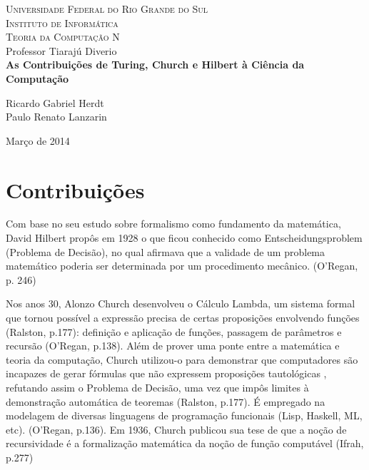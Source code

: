 \documentclass[a4paper]{article}
\author{Ricardo Gabriel Herdt (160622)\\
                Instituto de Informática,\\
                UFRGS}
\date{5 de Outubro de 2013}
\begin{document}
\begin{titlepage}
\begin{center}


\textsc{\large Universidade Federal do Rio Grande do Sul}\\[0.3cm]

\textsc{\large Instituto de Informática }\\[0.3cm]

\textsc{\large Teoria da Computação N }\\[0.3cm]

\large Professor Tiarajú Diverio \\[4.5cm]

{ \LARGE \bfseries As Contribuições de Turing, Church e Hilbert à Ciência
da Computação  \\[4.0cm] }


Ricardo Gabriel Herdt \\
Paulo Renato Lanzarin


\vfill

{\large Março de 2014}

\end{center}
\end{titlepage}




\section{Contribuições}

        Com base no seu estudo sobre formalismo como fundamento da matemática,
David Hilbert propôs em 1928 o que ficou conhecido como Entscheidungsproblem
(Problema de Decisão), no qual afirmava que a validade de um problema
matemático poderia ser determinada por um procedimento mecânico. (O'Regan, p.
246)

        Nos anos 30, Alonzo Church desenvolveu o Cálculo Lambda, um sistema
formal que tornou possível a expressão precisa de certas proposições envolvendo
funções (Ralston, p.177): definição e aplicação de funções, passagem de
parâmetros e recursão (O'Regan, p.138). Além de prover uma ponte entre  a
matemática e teoria da computação, Church utilizou-o para demonstrar que
computadores são incapazes de gerar fórmulas que não expressem proposições
tautológicas , refutando assim o Problema de Decisão, uma vez que impôs limites
à demonstração automática de teoremas (Ralston, p.177).  É empregado na
modelagem de diversas linguagens de programação funcionais (Lisp, Haskell, ML,
etc). (O'Regan, p.136).  Em 1936, Church publicou sua tese de que a noção de
recursividade é a formalização matemática da noção de função computável (Ifrah,
p.277)
\end{document}
